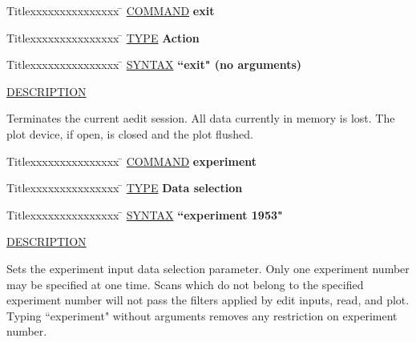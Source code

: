\begin{tabbing}
Titlexxxxxxxxxxxxxxx \= \kill
\underline{COMMAND} \> {\bf 	exit} \\
\end{tabbing}

\begin{tabbing}
Titlexxxxxxxxxxxxxxx \= \kill
\underline{TYPE} \> {\bf 		Action} \\
\end{tabbing}

\begin{tabbing}
Titlexxxxxxxxxxxxxxx \= \kill
\underline{SYNTAX} \> {\bf 		``exit" (no arguments)} \\
\end{tabbing}

\underline{DESCRIPTION}
\begin{list}{}{\setlength{\leftmargin}{0.5in}
     \setlength{\rightmargin}{0in}}
\item
Terminates the current aedit session.  All data currently in memory
is lost.  The plot device, if open, is closed and the plot flushed.
\end{list}
\vspace{.2in}

\begin{tabbing}
Titlexxxxxxxxxxxxxxx \= \kill
\underline{COMMAND} \> {\bf 	experiment} \\
\end{tabbing}

\begin{tabbing}
Titlexxxxxxxxxxxxxxx \= \kill
\underline{TYPE} \> {\bf 		Data selection} \\
\end{tabbing}

\begin{tabbing}
Titlexxxxxxxxxxxxxxx \= \kill
\underline{SYNTAX} \> {\bf 		``experiment 1953"} \\
\end{tabbing}

\underline{DESCRIPTION}
\begin{list}{}{\setlength{\leftmargin}{0.5in}
     \setlength{\rightmargin}{0in}}
\item
Sets the experiment input data selection parameter.  Only one
experiment number may be specified at one time.  Scans which do
not belong to the specified experiment number will not pass the
filters applied by edit inputs, read, and plot.  Typing ``experiment"
without arguments removes any restriction on experiment number.
\end{list}
\vspace{.2in}

